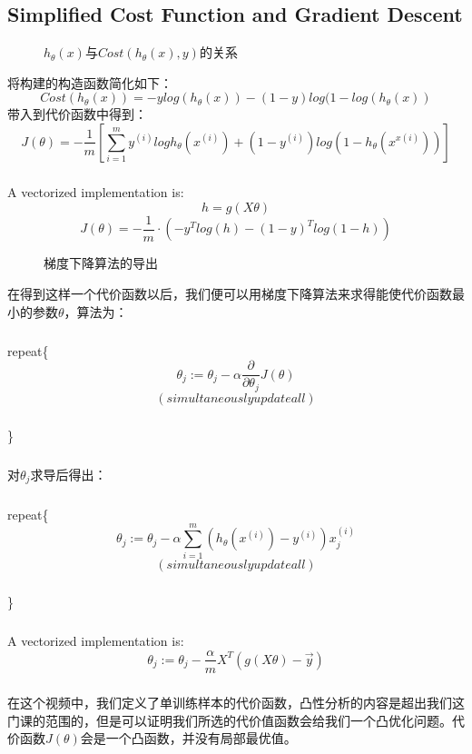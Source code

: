 \documentclass{article}
\begin{document}
\begin{CJK}{UTF8}{gbsn}
\subsection{Simplified Cost Function and Gradient Descent}
\begin{figure}[H]
\caption{$h_\theta(x)$与$Cost(h_\theta(x),y)$的关系}
\label{fig:326}
\end{figure}
将构建的构造函数简化如下：
\begin{equation}
Cost(h_\theta(x))=-ylog(h_\theta(x))-(1-y)log(1-log(h_\theta(x))
\end{equation}
带入到代价函数中得到：
\begin{equation}
J(\theta)=-\frac{1}{m}[\sum_{i=1}^my^{(i)}logh_\theta(x^{(i)})+(1-y^{(i)})log(1-h_\theta(x^{x(i)}))]
\end{equation}
\subparagraph{}
A vectorized implementation is:
\begin{equation}
h=g(X\theta)
\end{equation}
\begin{equation}
J(\theta)=-\frac{1}{m}\cdot(-y^Tlog(h)-(1-y)^Tlog(1-h))
\end{equation}
\begin{figure}[H]
\caption{梯度下降算法的导出}
\label{fig:327}
\end{figure}
在得到这样一个代价函数以后，我们便可以用梯度下降算法来求得能使代价函数最小的参数$\theta$，算法为：
\subparagraph{}
repeat\{{}
\begin{equation}
    \theta_j:=\theta_j-\alpha\frac{\partial}{\partial\theta_j}J(\theta)
\end{equation}
\begin{equation}
(simultaneously update all)
\end{equation}
\subparagraph{}
\}{}
\subparagraph{}
对$\theta_j$求导后得出：
\subparagraph{}
repeat\{{}
\begin{equation}
\theta_j:=\theta_j-\alpha\sum_{i=1}^m(h_\theta(x^{(i)})-y^{(i)})x_j^{(i)}
\end{equation}
\begin{equation}
(simultaneously update all)
\end{equation}
\subparagraph{}
\}{}
\subparagraph{}
A vectorized implementation is:
\begin{equation}
\theta_j:=\theta_j-\frac{\alpha}{m}X^T(g(X\theta)-\vec{y})
\end{equation}
\subparagraph{}
在这个视频中，我们定义了单训练样本的代价函数，凸性分析的内容是超出我们这门课的范围的，但是可以证明我们所选的代价值函数会给我们一个凸优化问题。代价函数$J(\theta)$会是一个凸函数，并没有局部最优值。

\end{CJK}
\end{document}
